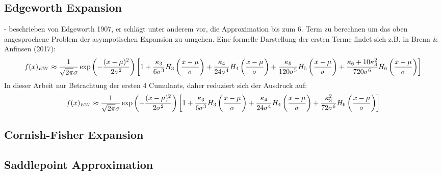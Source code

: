 \subsection{Edgeworth Expansion}
- beschrieben von Edgeworth 1907, er schlägt unter anderem vor, die Approximation bis zum 6. Term zu berechnen um das oben angesprochene Problem der asympotischen Expansion zu umgehen. Eine formelle Darstellung der ersten Terme findet sich z.B. in Brenn & Anfinsen (2017):
\begin{align}
    f(x)_{EW} \approx \frac{1}{\sqrt{2\pi}\sigma}\exp\left(-\frac{(x-\mu)^2}{2\sigma^2}\right) \left[1 + \frac{\kappa_3}{6\sigma^3}H_3\left(\frac{x-\mu}{\sigma}\right) + \frac{\kappa_4}{24\sigma^4}H_4\left(\frac{x-\mu}{\sigma}\right) + \frac{\kappa_5}{120\sigma^5}H_5\left(\frac{x-\mu}{\sigma}\right) + \frac{\kappa_6 + 10\kappa_3^2}{720\sigma^6}H_6\left(\frac{x-\mu}{\sigma}\right)\right] \notag
\end{align}
In dieser Arbeit nur Betrachtung der ersten 4 Cumulants, daher reduziert sich der Ausdruck auf:
\begin{align}
    f(x)_{EW} \approx \frac{1}{\sqrt{2\pi}\sigma}\exp\left(-\frac{(x-\mu)^2}{2\sigma^2}\right) \left[1 + \frac{\kappa_3}{6\sigma^3}H_3\left(\frac{x-\mu}{\sigma}\right) + \frac{\kappa_4}{24\sigma^4}H_4\left(\frac{x-\mu}{\sigma}\right) + \frac{\kappa_3^2}{72\sigma^6}H_6\left(\frac{x-\mu}{\sigma}\right)\right] \notag
\end{align}

\subsection{Cornish-Fisher Expansion}

\subsection{Saddlepoint Approximation}